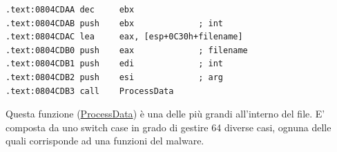 \documentclass[12pt,oneside]{fithesis2}
\begin{document}
        \begin{verbatim}        
.text:0804CDAA dec     ebx
.text:0804CDAB push    ebx             ; int
.text:0804CDAC lea     eax, [esp+0C30h+filename]
.text:0804CDB0 push    eax             ; filename
.text:0804CDB1 push    edi             ; int
.text:0804CDB2 push    esi             ; arg
.text:0804CDB3 call    ProcessData
        \end{verbatim}
        
        Questa funzione (\url{ProcessData}) è una delle più grandi all'interno del file. E' composta da uno switch case in grado di gestire 64 diverse casi, ognuna delle quali corrisponde ad una funzioni del malware.
        
        
        \clearpage
        
        
        
        
        
        
        
        
        
\end{document}
